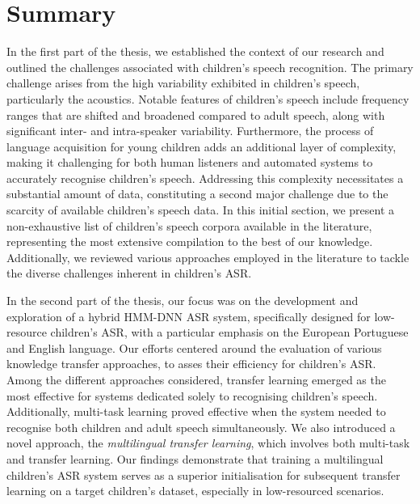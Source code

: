 \section{Summary}
In the first part of the thesis, we established the context of our research and outlined the challenges associated with children's speech recognition. The primary challenge arises from the high variability exhibited in children's speech, particularly the acoustics. Notable features of children's speech include frequency ranges that are shifted and broadened compared to adult speech, along with significant inter- and intra-speaker variability. Furthermore, the process of language acquisition for young children adds an additional layer of complexity, making it challenging for both human listeners and automated systems to accurately recognise children's speech. Addressing this complexity necessitates a substantial amount of data, constituting a second major challenge due to the scarcity of available children's speech data. In this initial section, we present a non-exhaustive list of children's speech corpora available in the literature, representing the most extensive compilation to the best of our knowledge. Additionally, we reviewed various approaches employed in the literature to tackle the diverse challenges inherent in children's \ac{ASR}.

In the second part of the thesis, our focus was on the development and exploration of a hybrid \ac{HMM-DNN} \ac{ASR} system, specifically designed for low-resource children's \ac{ASR}, with a particular emphasis on the European Portuguese and English language. Our efforts centered around the evaluation of various knowledge transfer approaches, to asses their efficiency for children's \ac{ASR}. Among the different approaches considered, transfer learning emerged as the most effective for systems dedicated solely to recognising children's speech. Additionally, multi-task learning proved effective when the system needed to recognise both children and adult speech simultaneously. We also introduced a novel approach, the \textit{multilingual transfer learning}, which involves both multi-task and transfer learning. Our findings demonstrate that training a multilingual children's \ac{ASR} system serves as a superior initialisation for subsequent transfer learning on a target children's dataset, especially in low-resourced scenarios.

